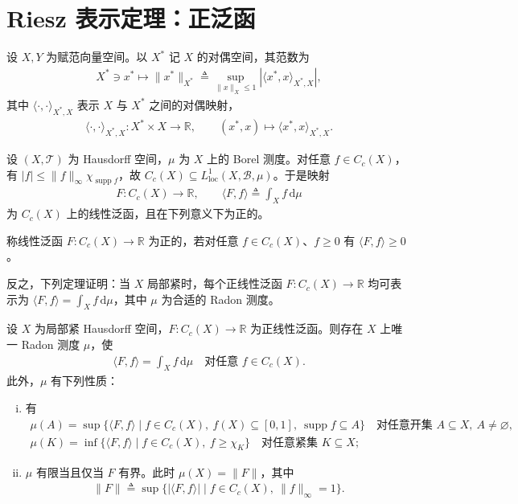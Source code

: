 \documentclass[../../main.tex]{subfiles}%
\begin{document}
\section{Riesz 表示定理：正泛函}\label{section:ch02-Riesz正泛函}

设 $X,Y$ 为赋范向量空间。以 $X^*$ 记 $X$ 的对偶空间，其范数为
\begin{align*}
X^*\ni x^*\mapsto\|x^*\|_{X^*}\triangleq \sup_{\|x\|_X\leqslant1}\left|\langle x^*,x\rangle_{X^*,X}\right|,
\end{align*}
其中 $\langle\cdot,\cdot\rangle_{X^*,X}$ 表示 $X$ 与 $X^*$ 之间的对偶映射，
\begin{align*}
\langle\cdot,\cdot\rangle_{X^*,X}:X^*\times X\to\mathbb R,\qquad(x^*,x)\mapsto\langle x^*,x\rangle_{X^*,X}.
\end{align*}

设 $(X,\mathscr T)$ 为 Hausdorff 空间，$\mu$ 为 $X$ 上的 Borel 测度。对任意 $f\in C_c(X)$，有 $|f|\leqslant\|f\|_\infty\chi_{\operatorname{supp}f}$，故 $C_c(X)\subseteq L^1_{\mathrm{loc}}(X,\mathscr B,\mu)$。于是映射
\begin{align*}
F:C_c(X)\to\mathbb R,\qquad \langle F,f\rangle\triangleq \int_X f\,\mathrm{d}\mu
\end{align*}
为 $C_c(X)$ 上的线性泛函，且在下列意义下为正的。

\begin{definition}\label{definition:ch02-正泛函}
称线性泛函 $F:C_c(X)\to\mathbb R$ 为正的，若对任意 $f\in C_c(X)$、$f\geqslant0$ 有 $\langle F,f\rangle\geqslant0$。
\end{definition}

反之，下列定理证明：当 $X$ 局部紧时，每个正线性泛函 $F:C_c(X)\to\mathbb R$ 均可表示为 $\langle F,f\rangle=\int_X f\,\mathrm{d}\mu$，其中 $\mu$ 为合适的 Radon 测度。

\begin{theorem}[Riesz]\label{theorem:ch02-Riesz正泛函}
设 $X$ 为局部紧 Hausdorff 空间，$F:C_c(X)\to\mathbb R$ 为正线性泛函。则存在 $X$ 上唯一 Radon 测度 $\mu$，使
\begin{align}
\langle F,f\rangle=\int_X f\,\mathrm{d}\mu\quad\text{对任意 }f\in C_c(X). \label{align:ch02-2.31}
\end{align}
此外，$\mu$ 有下列性质：
\begin{enumerate}[(i)]
\item 有
\begin{align}
\mu(A)=\sup\{\langle F,f\rangle\mid f\in C_c(X),\ f(X)\subseteq[0,1],\ \operatorname{supp}f\subseteq A\}\quad\text{对任意开集 }A\subseteq X,\ A\neq\varnothing , \label{align:ch02-2.32}\\
\mu(K)=\inf\{\langle F,f\rangle\mid f\in C_c(X),\ f\geqslant\chi_K\}\quad\text{对任意紧集 }K\subseteq X; \label{align:ch02-2.33}
\end{align}
\item $\mu$ 有限当且仅当 $F$ 有界。此时 $\mu(X)=\|F\|$，其中
\begin{align*}
\|F\|\triangleq \sup\{|\langle F,f\rangle|\mid f\in C_c(X),\ \|f\|_\infty=1\}.
\end{align*}
\end{enumerate}
\end{theorem}
\end{document}
